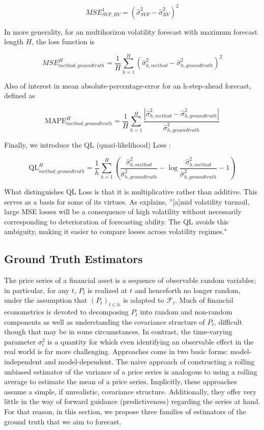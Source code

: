 \documentclass[11pt]{article}
\def\mc#1{\mathcal{#1}} %
\def\mc#1{\mathcal{#1}}
\theoremstyle{definition}
\begin{document}
$$ MSE^{1}_{SVF, RV} = (\hat\sigma^{2}_{SVF} - \hat\sigma^{2}_{RV})^{2}$$

In more generality, for an multihorizon volatility forecast with maximum forecast length $H$, the loss function is 

$$ MSE^{H}_{method, ground truth} = \frac{1}{H}\sum_{h=1}^{H}(\hat\sigma^{2}_{h, method} - \hat\sigma^{2}_{h, ground truth})^{2}$$

Also of interest in mean absolute-percentage-error for an h-step-ahead forecast, defined as

\[ 
\text{MAPE}^{H}_{method, ground truth} = \frac{1}{H}\sum_{h=1}^{H}\frac{|\hat\sigma^{2}_{h, method} - \hat\sigma^{2}_{h, ground truth}|}{\hat\sigma^{2}_{h, ground truth}}
\]

Finally, we introduce the QL (quasi-likelihood) Loss \citep{brownlees2011practical}:

\[ 
\text{QL}^{H}_{method, ground truth} = \frac{1}{h}\sum_{h=1}^{H} (\frac{ \hat\sigma^{2}_{h, method} }{\hat\sigma^{2}_{h, ground truth}} - \log{\frac{ \hat\sigma^{2}_{h, method} }{\hat\sigma^{2}_{h, ground truth}}} -1)
\]

What distinguishes QL Loss is that it is multiplicative rather than additive.  This serves as a basis for some of its virtues.  As \citet{brownlees2011practical} explains, ''[a]mid volatility turmoil, large MSE
losses will be a consequence of high volatility without necessarily corresponding to
deterioration of forecasting ability. The QL avoids this ambiguity, making it easier to
compare losses across volatility regimes."


\subsection{Ground Truth Estimators}
\label{Ground Truth Estimators}

The price series of a financial asset is a sequence of observable random variables; in particular, for any $t$, $P_{t}$ is realized at $t$ and henceforth no longer random, under the assumption that $(P_{t})_{t\in\mathbb{N}}$ is adapted to $\mc{F}_{t}$.  Much of financial econometrics is devoted to decomposing $P_{t}$ into random and non-random components as well as understanding the covariance structure of $P_{t}$, difficult though that may be in some circumstances.  In contrast, the time-varying parameter $\sigma^{2}_{t}$ is a quantity for which even identifying an observable effect in the real world is far more challenging.  Approaches come in two basic forms: model-independent and model-dependent.  The naive approach of constructing a rolling unbiased estimator of the variance of a price series is analogous to using a rolling average to estimate the mean of a price series.  Implicitly, these approaches assume a simple, if unrealistic, covariance structure.  Additionally, they offer very little in the way of forward guidance (predictiveness) regarding the series at hand.  For that reason, in this section, we propose three families of estimators of the ground truth that we aim to forecast.
\end{document}
